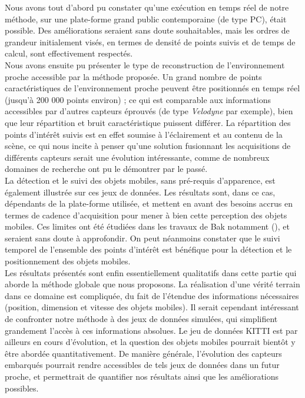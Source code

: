 Nous avons tout d'abord pu constater qu'une exécution en temps réel de notre méthode, sur une plate-forme grand public contemporaine (de type PC), était possible. Des améliorations seraient sans doute souhaitables, mais les ordres de grandeur initialement visés, en termes de densité de points suivis et de temps de calcul, sont effectivement respectés.\\
Nous avons ensuite pu présenter le type de reconstruction de l'environnement proche accessible par la méthode proposée. Un grand nombre de points caractéristiques de l'environnement proche peuvent être positionnés en temps réel (jusqu'à 200 000 points environ) ; ce qui est comparable aux informations accessibles par d'autres capteurs éprouvés (de type \textit{Velodyne} par exemple), bien que leur répartition et bruit caractéristique puissent différer. La répartition des points d'intérêt suivis est en effet soumise à l'éclairement et au contenu de la scène, ce qui nous incite à penser qu'une solution fusionnant les acquisitions de différents capteurs serait une évolution intéressante, comme de nombreux domaines de recherche ont pu le démontrer par le passé.\\
La détection et le suivi des objets mobiles, sans pré-requis d'apparence, est également illustrée sur ces jeux de données. Les résultats sont, dans ce cas, dépendants de la plate-forme utilisée, et mettent en avant des besoins accrus en termes de cadence d'acquisition pour mener à bien cette perception des objets mobiles. Ces limites ont été étudiées dans les travaux de Bak notamment (\cite{Bak2011}), et seraient sans doute à approfondir. On peut néanmoins constater que le suivi temporel de l'ensemble des points d'intérêt est bénéfique pour la détection et le positionnement des objets mobiles.\\

Les résultats présentés sont enfin essentiellement qualitatifs dans cette partie qui aborde la méthode globale que nous proposons. La réalisation d'une vérité terrain dans ce domaine est compliquée, du fait de l'étendue des informations nécessaires (position, dimension et vitesse des objets mobiles). Il serait cependant intéressant de confronter notre méthode à des jeux de données simulées, qui simplifient grandement l'accès à ces informations absolues. Le jeu de données KITTI est par ailleurs en cours d'évolution, et la question des objets mobiles pourrait bientôt y être abordée quantitativement. De manière générale, l'évolution des capteurs embarqués pourrait rendre accessibles de tels jeux de données dans un futur proche, et permettrait de quantifier nos résultats ainsi que les améliorations possibles.